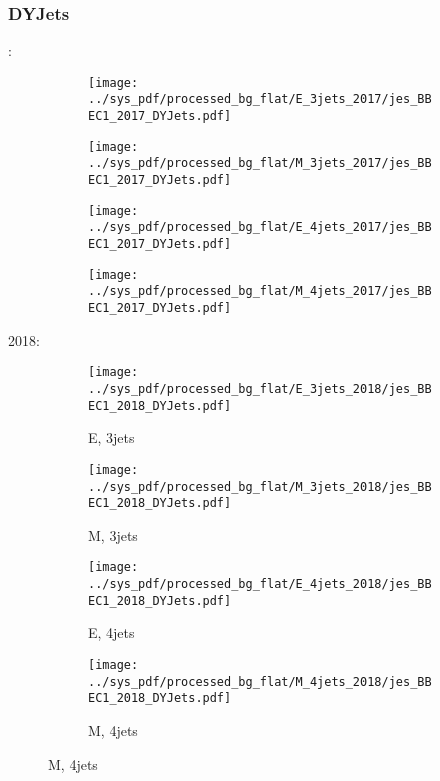 \documentclass{beamer}
\begin{document}
\begin{frame}
\frametitle{DYJets}
\fontsize{5}{1}:
\begin{figure}
\centering
\begin{subfigure}[b]{0.24\textwidth}
\texttt{[image: ../sys\_pdf/processed\_bg\_flat/E\_3jets\_2017/jes\_BBEC1\_2017\_DYJets.pdf]}
\end{subfigure}
\begin{subfigure}[b]{0.24\textwidth}
\texttt{[image: ../sys\_pdf/processed\_bg\_flat/M\_3jets\_2017/jes\_BBEC1\_2017\_DYJets.pdf]}
\end{subfigure}
\begin{subfigure}[b]{0.24\textwidth}
\texttt{[image: ../sys\_pdf/processed\_bg\_flat/E\_4jets\_2017/jes\_BBEC1\_2017\_DYJets.pdf]}
\end{subfigure}
\begin{subfigure}[b]{0.24\textwidth}
\texttt{[image: ../sys\_pdf/processed\_bg\_flat/M\_4jets\_2017/jes\_BBEC1\_2017\_DYJets.pdf]}
\end{subfigure}
\end{figure}
2018:
\begin{figure}
\centering
\begin{subfigure}[b]{0.24\textwidth}
\texttt{[image: ../sys\_pdf/processed\_bg\_flat/E\_3jets\_2018/jes\_BBEC1\_2018\_DYJets.pdf]}
\captionsetup{font=tiny}
\caption{E, 3jets}
\end{subfigure}
\begin{subfigure}[b]{0.24\textwidth}
\texttt{[image: ../sys\_pdf/processed\_bg\_flat/M\_3jets\_2018/jes\_BBEC1\_2018\_DYJets.pdf]}
\captionsetup{font=tiny}
\caption{M, 3jets}
\end{subfigure}
\begin{subfigure}[b]{0.24\textwidth}
\texttt{[image: ../sys\_pdf/processed\_bg\_flat/E\_4jets\_2018/jes\_BBEC1\_2018\_DYJets.pdf]}
\captionsetup{font=tiny}
\caption{E, 4jets}
\end{subfigure}
\begin{subfigure}[b]{0.24\textwidth}
\texttt{[image: ../sys\_pdf/processed\_bg\_flat/M\_4jets\_2018/jes\_BBEC1\_2018\_DYJets.pdf]}
\captionsetup{font=tiny}
\caption{M, 4jets}
\end{subfigure}
\end{figure}
\end{frame}
\end{document}
